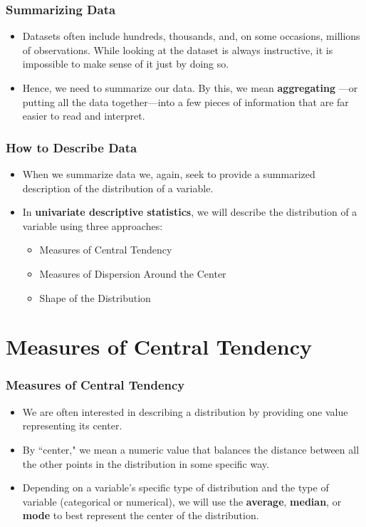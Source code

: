 \documentclass[handout]{beamer} %
\begin{document}
\begin{frame}
\frametitle{Summarizing Data}
\begin{itemize}
\item Datasets often include hundreds, thousands, and, on some occasions, millions of observations. While looking at the dataset is always instructive, it is impossible to make sense of it just by doing so.
\item Hence, we need to summarize our data. By this, we mean \textbf{aggregating} —or putting all the data together—into a few pieces of information that are far easier to read and interpret.
\end{itemize}
\end{frame}

\begin{frame}
\frametitle{How to Describe Data}
\begin{itemize}
\item When we summarize data we, again, seek to provide a summarized description of the distribution of a variable.
\item In \textbf{univariate descriptive statistics}, we will describe the distribution of a variable using three approaches:
\begin{itemize}
    \item Measures of Central Tendency
    \item Measures of Dispersion Around the Center
    \item Shape of the Distribution
\end{itemize}
\end{itemize}
\end{frame}

\section{Measures of Central Tendency}

\begin{frame}
\frametitle{Measures of Central Tendency}
\begin{itemize}
\item We are often interested in describing a distribution by providing one value representing its center.  \pause %
\item By ``center," we mean a numeric value that balances the distance between all the other points in the distribution in some specific way. \pause %
\item Depending on a variable's specific type of distribution and the type of variable (categorical or numerical), we will use the \textbf{average}, \textbf{median}, or \textbf{mode} to best represent the center of the distribution.
\end{itemize}
\end{frame}
\end{document}
